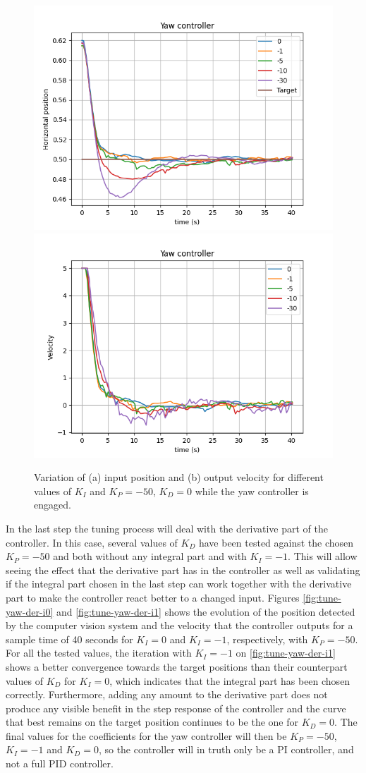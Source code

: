 \begin{figure}
  \centering
  \includegraphics[width=.45\linewidth]{img/pid/yaw/yaw_pos_p50_int_d0.png}
  \includegraphics[width=.45\linewidth]{img/pid/yaw/yaw_vel_p50_int_d0.png}
  \caption{Variation of (a) input position and (b) output velocity for different values of $K_{I}$ and $K_P=-50$, $K_D=0$ while the yaw controller is engaged.}\label{fig:tune-yaw-int-50}
\end{figure}

In the last step the tuning process will deal with the derivative part of the controller.
In this case, several values of $K_D$ have been tested against the chosen $K_P=-50$ and both without any integral part and with $K_I=-1$.
This will allow seeing the effect that the derivative part has in the controller as well as validating if the integral part chosen in the last step can work together with the derivative part to make the controller react better to a changed input.
Figures \ref{fig:tune-yaw-der-i0} and \ref{fig:tune-yaw-der-i1} shows the evolution of the position detected by the computer vision system and the velocity that the controller outputs for a sample time of 40 seconds for $K_I=0$ and $K_I=-1$, respectively, with $K_P=-50$.
For all the tested values, the iteration with $K_I=-1$ on \ref{fig:tune-yaw-der-i1} shows a better convergence towards the target positions than their counterpart values of $K_D$ for $K_I=0$, which indicates that the integral part has been chosen correctly.
Furthermore, adding any amount to the derivative part does not produce any visible benefit in the step response of the controller and the curve that best remains on the target position continues to be the one for $K_D=0$.
The final values for the coefficients for the yaw controller will then be $K_P=-50$, $K_I=-1$ and $K_D=0$, so the controller will in truth only be a PI controller, and not a full PID controller.


